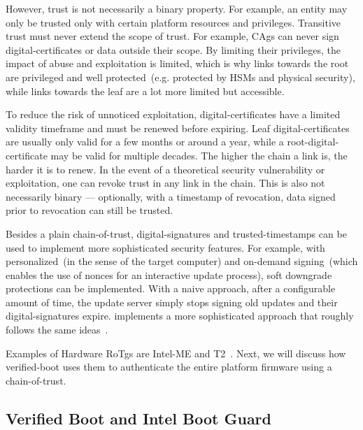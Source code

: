 However, trust is not necessarily a binary property. For example, an entity may only be trusted only with certain platform resources and privileges. Transitive trust must never extend the scope of trust. For example, \glspl{CAg} can never sign \glspl{digital-certificate} or data outside their scope. By limiting their privileges, the impact of abuse and exploitation is limited, which is why links towards the root are privileged and well protected~(e.g. protected by \glspl{HSM} and physical security), while links towards the leaf are a lot more limited but accessible.

To reduce the risk of unnoticed exploitation, \glspl{digital-certificate} have a limited validity timeframe and must be renewed before expiring. Leaf \glspl{digital-certificate} are usually only valid for a few months or around a year, while a \gls{root-digital-certificate} may be valid for multiple decades. The higher the chain a link is, the harder it is to renew. In the event of a theoretical security vulnerability or exploitation, one can revoke trust in any link in the chain. This is also not necessarily binary --- optionally, with a timestamp of revocation, data signed prior to revocation can still be trusted.

Besides a plain \gls{chain-of-trust}, \glspl{digital-signature} and \glspl{trusted-timestamp} can be used to implement more sophisticated security features. For example, with personalized~(in the sense of the target computer) and on-demand signing~(which enables the use of nonces for an interactive update process), soft downgrade protections can be implemented. With a naive approach, after a configurable amount of time, the update server simply stops signing old updates and their \glspl{digital-signature} expire.  implements a more sophisticated approach that roughly follows the same ideas~\cite{apple-sec}.

Examples of Hardware \glspl{RoTg} are \gls{Intel-ME} and  T2~\cite{apple-sec,uefi-secure-boot}. Next, we will discuss how \gls{verified-boot} uses them to authenticate the entire platform \gls{firmware} using a \gls{chain-of-trust}.

\subsection{Verified Boot and Intel Boot Guard}

